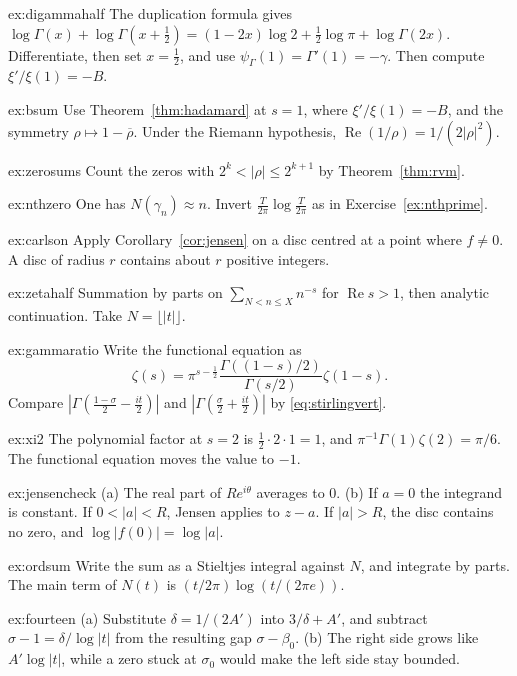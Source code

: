 \begin{hint}{ex:digammahalf}
The duplication formula gives $\log\Gamma(x)+\log\Gamma(x+\frac12)=(1-2x)\log2+\frac12\log\pi+\log\Gamma(2x)$. Differentiate, then set $x=\frac12$, and use $\psi_\Gamma(1)=\Gamma'(1)=-\gamma$. Then compute $\xi'/\xi(1)=-B$.
\end{hint}
\begin{hint}{ex:bsum}
Use Theorem~\ref{thm:hadamard} at $s=1$, where $\xi'/\xi(1)=-B$, and the symmetry $\rho\mapsto1-\overline\rho$. Under the Riemann hypothesis, $\operatorname{Re}(1/\rho)=1/(2|\rho|^2)$.
\end{hint}
\begin{hint}{ex:zerosums}
Count the zeros with $2^k<|\rho|\le2^{k+1}$ by Theorem~\ref{thm:rvm}.
\end{hint}
\begin{hint}{ex:nthzero}
One has $N(\gamma_n)\approx n$. Invert $\frac T{2\pi}\log\frac T{2\pi}$ as in Exercise~\ref{ex:nthprime}.
\end{hint}
\begin{hint}{ex:carlson}
Apply Corollary~\ref{cor:jensen} on a disc centred at a point where $f\ne0$. A disc of radius $r$ contains about $r$ positive integers.
\end{hint}
\begin{hint}{ex:zetahalf}
Summation by parts on $\sum_{N<n\le X}n^{-s}$ for $\operatorname{Re}s>1$, then analytic continuation. Take $N=\lfloor|t|\rfloor$.
\end{hint}
\begin{hint}{ex:gammaratio}
Write the functional equation as
\[\zeta(s)=\pi^{s-\frac12}\frac{\Gamma((1-s)/2)}{\Gamma(s/2)}\zeta(1-s).\]
Compare $|\Gamma(\frac{1-\sigma}2-\frac{it}2)|$ and $|\Gamma(\frac\sigma2+\frac{it}2)|$ by \eqref{eq:stirlingvert}.
\end{hint}

\begin{hint}{ex:xi2}
The polynomial factor at $s=2$ is $\frac12\cdot2\cdot1=1$, and $\pi^{-1}\Gamma(1)\zeta(2)=\pi/6$. The functional equation moves the value to $-1$.
\end{hint}
\begin{hint}{ex:jensencheck}
(a) The real part of $Re^{i\theta}$ averages to $0$. (b) If $a=0$ the integrand is constant. If $0<|a|<R$, Jensen applies to $z-a$. If $|a|>R$, the disc contains no zero, and $\log|f(0)|=\log|a|$.
\end{hint}
\begin{hint}{ex:ordsum}
Write the sum as a Stieltjes integral against $N$, and integrate by parts. The main term of $N(t)$ is $(t/2\pi)\log(t/(2\pi e))$.
\end{hint}
\begin{hint}{ex:fourteen}
(a) Substitute $\delta=1/(2A')$ into $3/\delta+A'$, and subtract $\sigma-1=\delta/\log|t|$ from the resulting gap $\sigma-\beta_0$. (b) The right side grows like $A'\log|t|$, while a zero stuck at $\sigma_0$ would make the left side stay bounded.
\end{hint}

